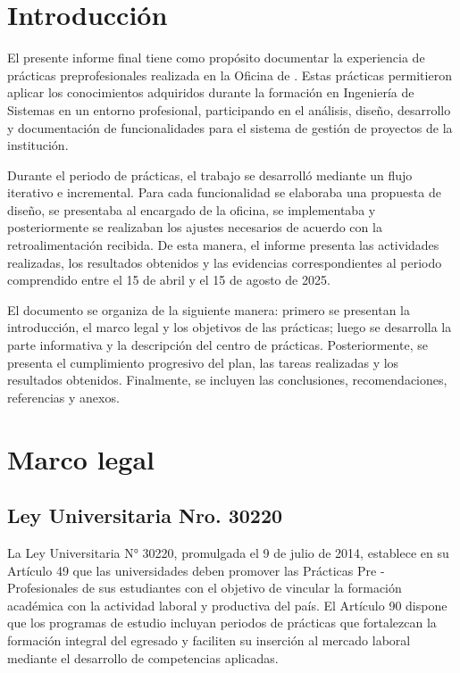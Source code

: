 
\newpage
\section{Introducción}
El presente informe final tiene como propósito documentar la experiencia de prácticas preprofesionales realizada en la Oficina de \InstitucionNombre. Estas prácticas permitieron aplicar los conocimientos adquiridos durante la formación en Ingeniería de Sistemas en un entorno profesional, participando en el análisis, diseño, desarrollo y documentación de funcionalidades para el sistema de gestión de proyectos de la institución.

Durante el periodo de prácticas, el trabajo se desarrolló mediante un flujo iterativo e incremental. Para cada funcionalidad se elaboraba una propuesta de diseño, se presentaba al encargado de la oficina, se implementaba y posteriormente se realizaban los ajustes necesarios de acuerdo con la retroalimentación recibida. De esta manera, el informe presenta las actividades realizadas, los resultados obtenidos y las evidencias correspondientes al periodo comprendido entre el 15 de abril y el 15 de agosto de 2025.

El documento se organiza de la siguiente manera: primero se presentan la introducción, el marco legal y los objetivos de las prácticas; luego se desarrolla la parte informativa y la descripción del centro de prácticas. Posteriormente, se presenta el cumplimiento progresivo del plan, las tareas realizadas y los resultados obtenidos. Finalmente, se incluyen las conclusiones, recomendaciones, referencias y anexos.

\section{Marco legal}
\subsection{Ley Universitaria Nro. 30220}
La Ley Universitaria N° 30220, promulgada el 9 de julio de 2014, establece en su Artículo 49 que las universidades deben promover las Prácticas Pre - Profesionales de sus estudiantes con el objetivo de vincular la formación académica con la actividad laboral y productiva del país. El Artículo 90 dispone que los programas de estudio incluyan periodos de prácticas que fortalezcan la formación integral del egresado y faciliten su inserción al mercado laboral mediante el desarrollo de competencias aplicadas.


